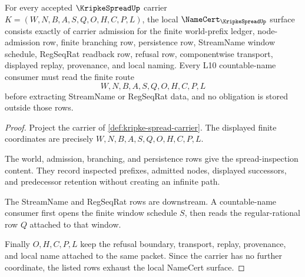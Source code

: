 \begin{theorem}
\label{thm:kripke-spread-namecert-obligations}
For every accepted $\KripkeSpreadUp$ carrier $K=(W,N,B,A,S,Q,O,H,C,P,L)$, the local $\NameCert_{\KripkeSpreadUp}$ surface consists exactly of carrier admission for the finite world-prefix ledger, node-admission row, finite branching row, persistence row, StreamName window schedule, RegSeqRat readback row, refusal row, componentwise transport, displayed replay, provenance, and local naming. Every L10 countable-name consumer must read the finite route
$$
W,N,B,A,S,Q,O,H,C,P,L
$$
before extracting StreamName or RegSeqRat data, and no obligation is stored outside those rows.
\end{theorem}
\begin{proof}
Project the carrier of \autoref{def:kripke-spread-carrier}. The displayed finite coordinates are precisely $W,N,B,A,S,Q,O,H,C,P,L$.

The world, admission, branching, and persistence rows give the spread-inspection content. They record inspected prefixes, admitted nodes, displayed successors, and predecessor retention without creating an infinite path.

The StreamName and RegSeqRat rows are downstream. A countable-name consumer first opens the finite window schedule $S$, then reads the regular-rational row $Q$ attached to that window.

Finally $O,H,C,P,L$ keep the refusal boundary, transport, replay, provenance, and local name attached to the same packet. Since the carrier has no further coordinate, the listed rows exhaust the local NameCert surface.
\end{proof}


